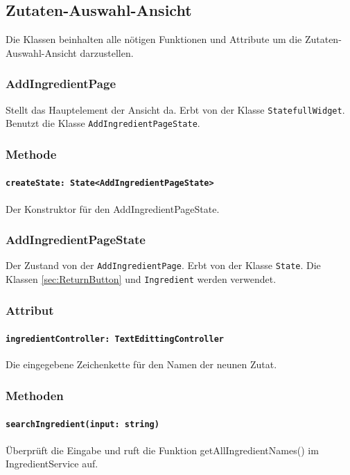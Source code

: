 \documentclass[parskip=full]{scrartcl}
\begin{document}
    \newpage

\subsection{Zutaten-Auswahl-Ansicht}
        Die Klassen beinhalten alle nötigen Funktionen und Attribute um die Zutaten-Auswahl-Ansicht darzustellen.
    
        \subsubsection{AddIngredientPage}
        Stellt das Hauptelement der Ansicht da. Erbt von der Klasse \texttt{StatefullWidget}. Benutzt die Klasse \texttt{AddIngredientPageState}.
            \subsubsection*{Methode}
                \paragraph*{\texttt{createState: State<AddIngredientPageState>}} Der Konstruktor für den AddIngredientPageState.
        
        \subsubsection{AddIngredientPageState}
        Der Zustand von der \texttt{AddIngredientPage}. Erbt von der Klasse \texttt{State}. Die Klassen \ref{sec:ReturnButton} und \texttt{Ingredient} werden verwendet.
            \subsubsection*{Attribut}
                \paragraph*{\texttt{ingredientController: TextEdittingController}} Die eingegebene Zeichenkette für den Namen der neunen Zutat.
    
            \subsubsection*{Methoden}
                \paragraph*{\texttt{searchIngredient(input: string)}} Überprüft die Eingabe und ruft die Funktion getAllIngredientNames() im IngredientService auf.
\end{document}
